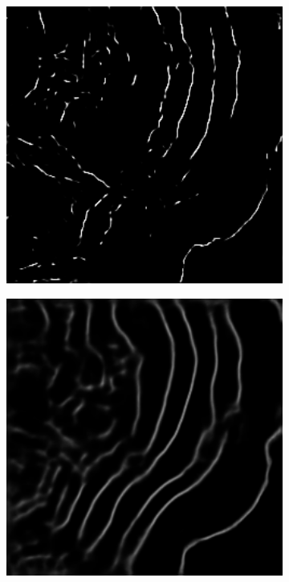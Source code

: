 \begin{figure}[!t]
\begin{subfigure}[t]{0.24\textwidth}
        \includegraphics[width=1\textwidth, valign=c]{images/aug-none.png}
        \caption{}
    \end{subfigure}
    \begin{subfigure}[t]{0.24\textwidth}
        \centering
        \includegraphics[width=1\textwidth, valign=c]{images/aug-normal.png}

\end{subfigure}
\end{figure}
